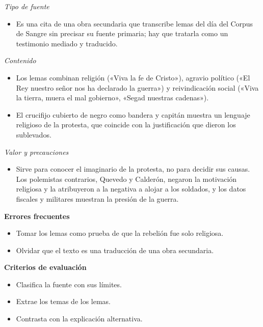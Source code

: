 \documentclass{book}
\begin{document}
\begin{tcolorbox}[title={Ejercicio resuelto}, studiumworked, breakable]
\noindent\textit{Tipo de fuente}
\begin{itemize}
\item Es una cita de una obra secundaria que transcribe lemas del día del Corpus de Sangre sin precisar su fuente primaria; hay que tratarla como un testimonio mediado y traducido.
\end{itemize}

\noindent\textit{Contenido}
\begin{itemize}
\item Los lemas combinan religión («Viva la fe de Cristo»), agravio político («El Rey nuestro señor nos ha declarado la guerra») y reivindicación social («Viva la tierra, muera el mal gobierno», «Segad nuestras cadenas»).
\item El crucifijo cubierto de negro como bandera y capitán muestra un lenguaje religioso de la protesta, que coincide con la justificación que dieron los sublevados.
\end{itemize}

\noindent\textit{Valor y precauciones}
\begin{itemize}
\item Sirve para conocer el imaginario de la protesta, no para decidir sus causas. Los polemistas contrarios, Quevedo y Calderón, negaron la motivación religiosa y la atribuyeron a la negativa a alojar a los soldados, y los datos fiscales y militares muestran la presión de la guerra.
\end{itemize}

\noindent\textbf{Errores frecuentes}
\begin{itemize}
\item Tomar los lemas como prueba de que la rebelión fue solo religiosa.
\item Olvidar que el texto es una traducción de una obra secundaria.
\end{itemize}

\noindent\textbf{Criterios de evaluación}
\begin{itemize}
\item Clasifica la fuente con sus límites.
\item Extrae los temas de los lemas.
\item Contrasta con la explicación alternativa.
\end{itemize}
\end{tcolorbox}
\end{document}
